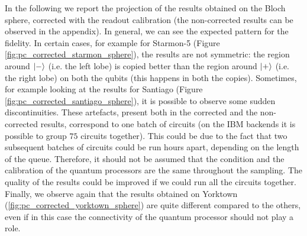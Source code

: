 In the following we report the projection of the results obtained on the Bloch sphere, corrected with the readout calibration (the non-corrected results can be observed in the appendix). 
In general, we can see the expected pattern for the fidelity.
In certain cases, for example for Starmon-5 (Figure \ref{fig:pc_corrected_starmon_sphere}), the results are not symmetric: the region around $\ket{-}$ (i.e. the left lobe) is copied better than the region around $\ket{+}$ (i.e. the right lobe) on both the qubits (this happens in both the copies).
Sometimes, for example looking at the results for Santiago (Figure \ref{fig:pc_corrected_santiago_sphere}), it is possible to observe some sudden discontinuities.
These artefacts, present both in the corrected and the non-corrected results, correspond to one batch of circuits (on the IBM backends it is possible to group $75$ circuits together).
This could be due to the fact that two subsequent batches of circuits could be run hours apart, depending on the length of the queue.
Therefore, it should not be assumed that the condition and the calibration of the quantum processors are the same throughout the sampling.
The quality of the results could be improved if we could run all the circuits together.
Finally, we observe again that the results obtained on Yorktown (\ref{fig:pc_corrected_yorktown_sphere}) are quite different compared to the others, even if in this case the connectivity of the quantum processor should not play a role.

